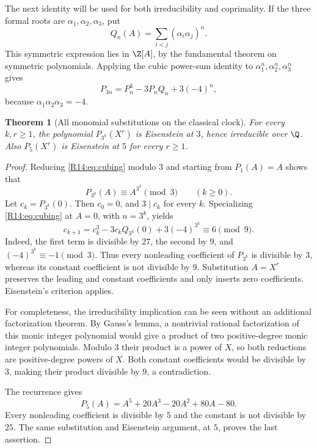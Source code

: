 \documentclass[11pt,a4paper]{article}
\newtheorem{theorem}{Theorem}[section]
\theoremstyle{definition}\newtheorem{definition}[theorem]{Definition}
\theoremstyle{remark}\newtheorem{remark}[theorem]{Remark}
\begin{document}
The next identity will be used for both irreducibility and
coprimality. If the three formal roots are $\alpha_1,\alpha_2,\alpha_3$,
put
\[
 Q_n(A)=\sum_{i<j}(\alpha_i\alpha_j)^n.
\]
This symmetric expression lies in $\Z[A]$, by the fundamental
theorem on symmetric polynomials. Applying the cubic power-sum
identity to $\alpha_1^n,\alpha_2^n,\alpha_3^n$ gives
\begin{equation}\label{R14:eq:cubing}
 P_{3n}=P_n^3-3P_nQ_n+3(-4)^n,
\end{equation}
because $\alpha_1\alpha_2\alpha_3=-4$.

\begin{theorem}[All monomial substitutions on the classical clock]
\label{R14:thm:eisenstein}
For every $k,r\ge1$, the polynomial $P_{3^k}(X^r)$ is Eisenstein
at $3$, hence irreducible over $\Q$. Also $P_5(X^r)$ is Eisenstein
at $5$ for every $r\ge1$.
\end{theorem}

\begin{proof}
Reducing \eqref{R14:eq:cubing} modulo $3$ and starting from $P_1(A)=A$
shows that
\begin{equation}\label{R14:eq:frobenius}
 P_{3^k}(A)\equiv A^{3^k}\pmod3\qquad(k\ge0).
\end{equation}
Let $c_k=P_{3^k}(0)$. Then $c_0=0$, and $3\mid c_k$ for every
$k$. Specializing \eqref{R14:eq:cubing} at $A=0$, with $n=3^k$, yields
\[
 c_{k+1}=c_k^3-3c_kQ_{3^k}(0)+3(-4)^{3^k}
 \equiv6\pmod9.
\]
Indeed, the first term is divisible by $27$, the second by $9$,
and $(-4)^{3^k}\equiv-1\pmod3$. Thus every nonleading coefficient
of $P_{3^k}$ is divisible by $3$, whereas its constant coefficient
is not divisible by $9$. Substitution $A=X^r$ preserves the leading
and constant coefficients and only inserts zero coefficients.
Eisenstein's criterion applies.

For completeness, the irreducibility implication can be seen
without an additional factorization theorem. By Gauss's lemma, a
nontrivial rational factorization of this monic integer polynomial
would give a product of two positive-degree monic integer
polynomials. Modulo $3$ their product is a power of $X$, so both
reductions are positive-degree powers of $X$. Both constant
coefficients would be divisible by $3$, making their product
divisible by $9$, a contradiction.

The recurrence gives
\[
 P_5(A)=A^5+20A^3-20A^2+80A-80.
\]
Every nonleading coefficient is divisible by $5$ and the constant
is not divisible by $25$. The same substitution and Eisenstein
argument, at $5$, proves the last assertion.
\end{proof}
\end{document}
